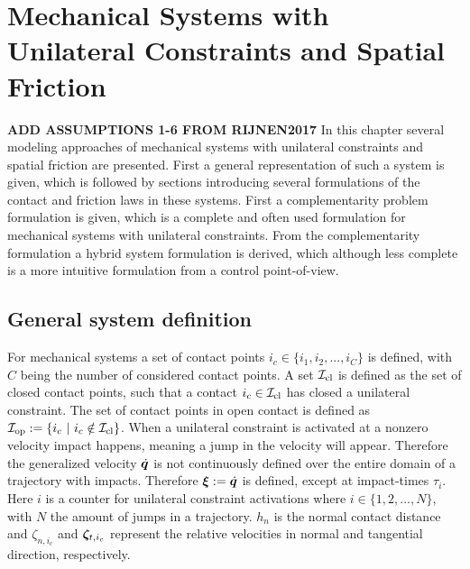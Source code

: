 \documentclass[../DC2017114Bouma.tex]{subfiles}
\begin{document}
\graphicspath{{02_Material/img/}}
\renewcommand{\chaptermark}[1]{\markboth{\thechapter.\ #1}{}}
\renewcommand{\sectionmark}[1]{\markright{#1}{}}
\pagestyle{fancyreport}
\cleartooddpage
\pagestyle{fancyreport}
\chapter{Mechanical Systems with Unilateral Constraints and Spatial Friction}\label{ch:model}
\textbf{ADD ASSUMPTIONS 1-6 FROM RIJNEN2017}
In this chapter several modeling approaches of mechanical systems with unilateral constraints and spatial friction are presented. First a general representation of such a system is given, which is followed by sections introducing several formulations of the contact and friction laws in these systems. First a complementarity problem formulation is given, which is a complete and often used formulation for mechanical systems with unilateral constraints. From the complementarity formulation a hybrid system formulation is derived, which although less complete is a more intuitive formulation from a control point-of-view.
\section{General system definition}
For mechanical systems a set of contact points $i_c\in\{i_1,i_2,...,i_C\}$ is defined, with $C$ being the number of considered contact points. A set $\mathcal{I}_{\text{cl}}$ is defined as the set of closed contact points, such that a contact $i_c\in\mathcal{I}_{\text{cl}}$ has closed a unilateral constraint. The set of contact points in open contact is defined as $\Ic_{\text{op}} := \{i_c\ |\ i_c\notin\Ic_{\text{cl}}\}$. When a unilateral constraint is activated at a nonzero velocity impact happens, meaning a jump in the velocity will appear. Therefore the generalized velocity $\dot{{\boldsymbol{q}}}$ is not continuously defined over the entire domain of a trajectory with impacts. Therefore $\boldsymbol{\xi}:=\dot{{\boldsymbol{q}}}$ is defined, except at impact-times $\tau_i$. Here $i$ is a counter for unilateral constraint activations where $i\in \{1,2,...,N\}$, with $N$ the amount of jumps in a trajectory. $h_n$ is the normal contact distance and $\zeta_{n,i_c}$ and $\boldsymbol{\zeta}_{t,i_c}$ represent the relative velocities in normal and tangential direction,  respectively. 
\end{document}

